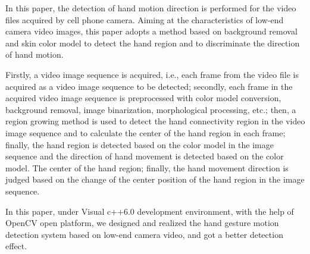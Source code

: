

In this paper, the detection of hand motion direction is performed for the video files acquired by cell phone camera. Aiming at the characteristics of low-end camera video images, this paper adopts a method based on background removal and skin color model to detect the hand region and to discriminate the direction of hand motion.

Firstly, a video image sequence is acquired, i.e., each frame from the video file is acquired as a video image sequence to be detected; secondly, each frame in the acquired video image sequence is preprocessed with color model conversion, background removal, image binarization, morphological processing, etc.; then, a region growing method is used to detect the hand connectivity region in the video image sequence and to calculate the center of the hand region in each frame; finally, the hand region is detected based on the color model in the image sequence and the direction of hand movement is detected based on the color model. The center of the hand region; finally, the hand movement direction is judged based on the change of the center position of the hand region in the image sequence.

In this paper, under Visual c++6.0 development environment, with the help of OpenCV open platform, we designed and realized the hand gesture motion detection system based on low-end camera video, and got a better detection effect.


